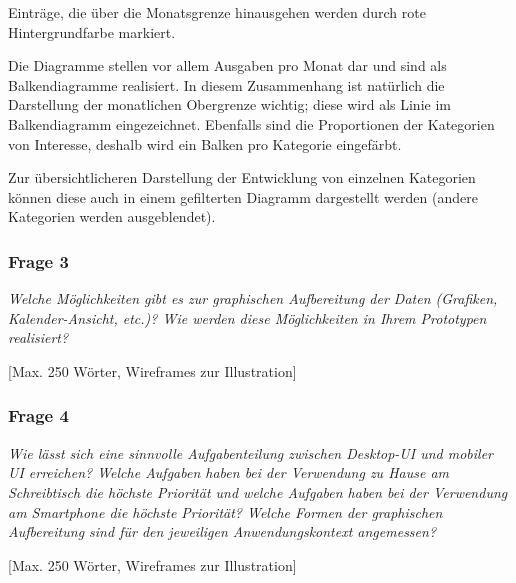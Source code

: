 Eintr\"age, die \"uber die Monatsgrenze hinausgehen werden durch rote Hintergrundfarbe
markiert.

Die Diagramme stellen vor allem Ausgaben pro Monat dar und sind als Balkendiagramme realisiert.
In diesem Zusammenhang ist nat\"urlich die Darstellung der monatlichen Obergrenze wichtig;
diese wird als Linie im Balkendiagramm eingezeichnet. Ebenfalls sind die Proportionen der Kategorien
von Interesse, deshalb wird ein Balken pro Kategorie eingef\"arbt.

Zur \"ubersichtlicheren Darstellung der Entwicklung von einzelnen Kategorien k\"onnen
diese auch in einem gefilterten Diagramm dargestellt werden (andere Kategorien werden
ausgeblendet).



\subsubsection{Frage 3}

\emph{Welche Möglichkeiten gibt es zur graphischen Aufbereitung der Daten (Grafiken, Kalender-Ansicht, etc.)? Wie werden diese Möglichkeiten in Ihrem Prototypen realisiert?}

\vspace{2mm}



[Max. 250 Wörter, Wireframes zur Illustration]



\subsubsection{Frage 4}

\emph{Wie lässt sich eine sinnvolle Aufgabenteilung zwischen Desktop-UI und mobiler UI erreichen? Welche Aufgaben haben bei der Verwendung zu Hause am Schreibtisch die höchste Priorität und welche Aufgaben haben bei der Verwendung am Smartphone die höchste Priorität? Welche Formen der graphischen Aufbereitung sind für den jeweiligen Anwendungskontext angemessen?}

\vspace{2mm}



[Max. 250 Wörter, Wireframes zur Illustration]
